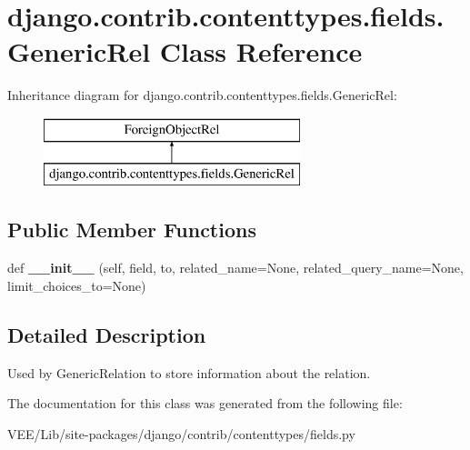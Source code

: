 \hypertarget{classdjango_1_1contrib_1_1contenttypes_1_1fields_1_1_generic_rel}{}\section{django.\+contrib.\+contenttypes.\+fields.\+Generic\+Rel Class Reference}
\label{classdjango_1_1contrib_1_1contenttypes_1_1fields_1_1_generic_rel}
Inheritance diagram for django.\+contrib.\+contenttypes.\+fields.\+Generic\+Rel\+:\begin{figure}[H]
\begin{center}
\leavevmode
\includegraphics[height=2.000000cm]{classdjango_1_1contrib_1_1contenttypes_1_1fields_1_1_generic_rel}
\end{center}
\end{figure}
\subsection*{Public Member Functions}
\begin{DoxyCompactItemize}
\item 
\mbox{\label{classdjango_1_1contrib_1_1contenttypes_1_1fields_1_1_generic_rel_a5cf1988b7300cf7c2ed00da669c073a3}} 
def {\bfseries \+\_\+\+\_\+init\+\_\+\+\_\+} (self, field, to, related\+\_\+name=None, related\+\_\+query\+\_\+name=None, limit\+\_\+choices\+\_\+to=None)
\end{DoxyCompactItemize}


\subsection{Detailed Description}
\begin{DoxyVerb}Used by GenericRelation to store information about the relation.
\end{DoxyVerb}
 

The documentation for this class was generated from the following file\+:\begin{DoxyCompactItemize}
\item 
V\+E\+E/\+Lib/site-\/packages/django/contrib/contenttypes/fields.\+py\end{DoxyCompactItemize}
